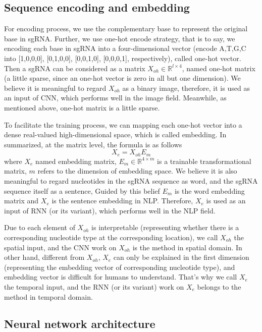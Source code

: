 \documentclass{bioinfo}
\begin{document}
\subsection{Sequence encoding and embedding}

For encoding process, we use the complementary base to represent the original base in sgRNA. 
Further, we use one-hot encode strategy, that is to say, we encoding each base in sgRNA into a four-dimensional vector 
(encode A,T,G,C into [1,0,0,0], [0,1,0,0], [0,0,1,0], [0,0,0,1], respectively), called one-hot vector. 
Then a sgRNA can be considered as a matrix $X_{oh}\in\mathbb{R}^{l\times4} $, named one-hot matrix (a little sparse, since an one-hot vector is zero in all but one dimension). 
We believe it is meaningful to regard $X_{oh}$ as a binary image, 
therefore, it is used as an input of CNN, which performs well in the image field.
Meanwhile, as mentioned above, one-hot matrix is a little sparse. 

To facilitate the training process, we can mapping each one-hot vector into a dense real-valued high-dimensional space, which is called embedding. 
In summarized, at the matrix level, the formula is as follows
\begin{equation}
X_e=X_{oh}E_m\label{eq:08}
\end{equation}
where $X_e$ named embedding matrix, $E_m\in\mathbb{R}^{4\times m}$ is a trainable transformational matrix, $m$ refers to the dimension of embedding space. 
We believe it is also meaningful to regard nucleotides in the sgRNA sequence as word, and the sgRNA sequence itself as a sentence, 
Guided by this belief $E_m$ is the word embedding matrix and $X_e$ is the sentence embedding in NLP.
Therefore, $X_e$ is used as an input of RNN (or its variant), which performs well in the NLP field.

Due to each element of $X_{oh}$ is interpretable (representing whether there is a corresponding nucleotide type at the corresponding location), 
we call $X_{oh}$ the spatial input, and the CNN work on $X_{oh}$ is the method in spatial domain. 
In other hand, different from $X_{oh}$, $X_e$ can only be explained in the first dimension (representing the embedding vector of corresponding nucleotide type), 
and embedding vector is difficult for humans to understand. 
That's why we call $X_e$ the temporal input, and the RNN (or its variant) work on $X_e$ belongs to the method in temporal domain. 

\subsection{Neural network architecture}
\end{document}

